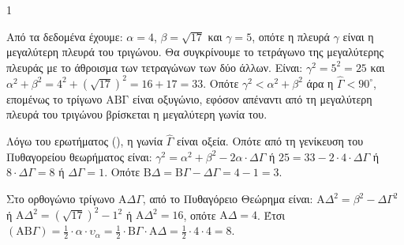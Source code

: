 \begin{ylh}{1}
    \item [Ύλη από εικόνα]
\end{ylh}
\begin{figure}
    \centering
\end{figure}
\begin{alist}
\item [\textalpha)] Από τα δεδομένα έχουμε: $\alpha = 4$, $\beta = \sqrt{17}$ και $\gamma = 5$, οπότε η πλευρά $\gamma$ είναι η μεγαλύτερη πλευρά του τριγώνου. Θα συγκρίνουμε το τετράγωνο της μεγαλύτερης πλευράς με το άθροισμα των τετραγώνων των δύο άλλων.
    Είναι: $\gamma^2 = 5^2 = 25$ και $\alpha^2 + \beta^2 = 4^2 + \left(\sqrt{17}\right)^2 = 16 + 17 = 33$.
    Οπότε $\gamma^2 < \alpha^2 + \beta^2$ άρα η $\widehat{\Gamma} < 90^\circ$, επομένως το τρίγωνο $\text{ΑΒΓ}$ είναι οξυγώνιο, εφόσον απέναντι από τη μεγαλύτερη πλευρά του τριγώνου βρίσκεται η μεγαλύτερη γωνία του.
\item [\textbeta)]
    \begin{rlist}
    \item Λόγω του ερωτήματος (\textalpha), η γωνία $\widehat{\Gamma}$ είναι οξεία. Οπότε από τη γενίκευση του Πυθαγορείου θεωρήματος είναι:
        $\gamma^2 = \alpha^2 + \beta^2 - 2\alpha \cdot \Delta\Gamma$ ή $25 = 33 - 2 \cdot 4 \cdot \Delta\Gamma$ ή $8 \cdot \Delta\Gamma = 8$ ή $\Delta\Gamma = 1$.
        Οπότε $\text{B}\Delta = \text{B}\Gamma - \Delta\Gamma = 4 - 1 = 3$.
    \item Στο ορθογώνιο τρίγωνο $\text{Α}\Delta\Gamma$, από το Πυθαγόρειο Θεώρημα είναι:
        $\text{A}\Delta^2 = \beta^2 - \Delta\Gamma^2$ ή $\text{A}\Delta^2 = \left(\sqrt{17}\right)^2 - 1^2$ ή $\text{A}\Delta^2 = 16$, οπότε $\text{A}\Delta = 4$.
        Έτσι $(\text{AB}\Gamma) = \frac{1}{2} \cdot \alpha \cdot \upsilon_\alpha = \frac{1}{2} \cdot \text{B}\Gamma \cdot \text{A}\Delta = \frac{1}{2} \cdot 4 \cdot 4 = 8$.
    \end{rlist}
\end{alist}